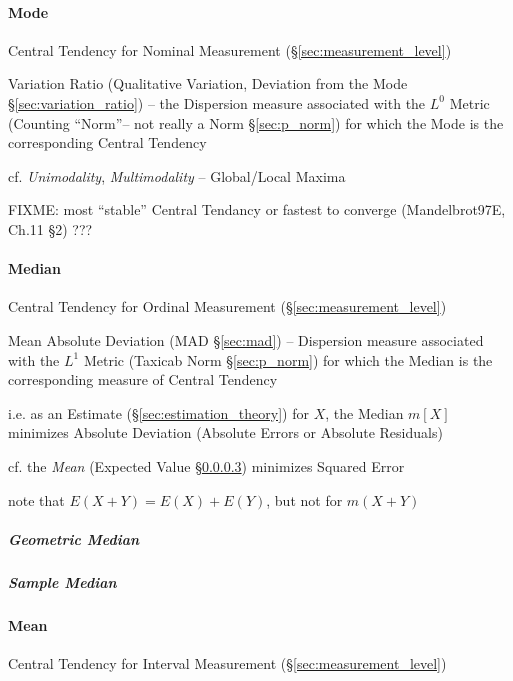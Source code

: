 \paragraph{Mode}\label{sec:mode}\hfill

Central Tendency for Nominal Measurement (\S\ref{sec:measurement_level})

\fist Variation Ratio (Qualitative Variation, Deviation from the Mode
\S\ref{sec:variation_ratio}) -- the Dispersion measure associated with the $L^0$
Metric (Counting ``Norm''-- not really a Norm \S\ref{sec:p_norm}) for which the
Mode is the corresponding Central Tendency

cf. \emph{Unimodality}, \emph{Multimodality} -- Global/Local Maxima

FIXME: most ``stable'' Central Tendancy or fastest to converge (Mandelbrot97E,
Ch.11 \S 2) ???



\paragraph{Median}\label{sec:median}\hfill

Central Tendency for Ordinal Measurement (\S\ref{sec:measurement_level})

\fist Mean Absolute Deviation (MAD \S\ref{sec:mad}) -- Dispersion measure
associated with the $L^1$ Metric (Taxicab Norm \S\ref{sec:p_norm}) for which the
Median is the corresponding measure of Central Tendency

i.e. as an Estimate (\S\ref{sec:estimation_theory}) for $X$, the Median $m[X]$
minimizes Absolute Deviation (Absolute Errors or Absolute Residuals)

cf. the \emph{Mean} (Expected Value \S\ref{sec:mean}) minimizes Squared Error

note that $E(X + Y) = E(X) + E(Y)$, but not for $m(X+Y)$



\subparagraph{Geometric Median}\label{sec:geometric_median}\hfill

\subparagraph{Sample Median}\label{sec:sample_median}\hfill



\paragraph{Mean}\label{sec:mean}\hfill

Central Tendency for Interval Measurement (\S\ref{sec:measurement_level})

